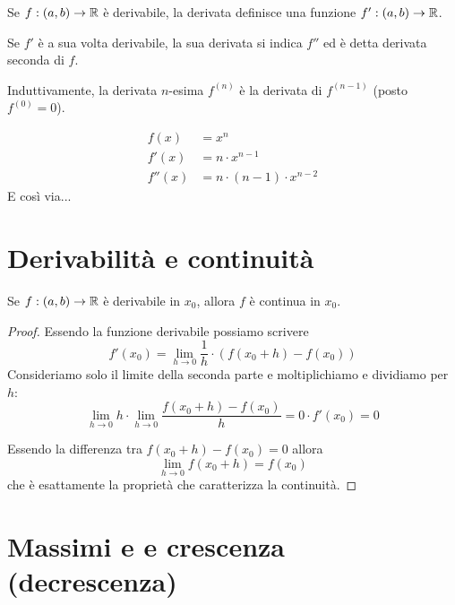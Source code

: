 \begin{definition}
Se $f: (a, b) \to \mathbb R$ è derivabile, la derivata definisce una funzione $f': (a, b) \to \mathbb R$.
\end{definition}

Se $f'$ è a sua volta derivabile, la sua derivata si indica $f''$ ed è detta derivata seconda di $f$. 

Induttivamente, la derivata $n$-esima $f^{(n)}$ è la derivata di $f^{(n-1)}$ (posto $f^{(0)} = 0$).

\begin{example}
\begin{align*}
f(x) &= x^n \\
f'(x) &= n \cdot x^{n-1} \\
f''(x) &= n \cdot (n-1) \cdot x^{n-2} 
\end{align*}
E così via...
\end{example}

\section{Derivabilità e continuità}

\begin{proposition}
Se $f : (a, b) \to \mathbb R$ è derivabile in $x_0$, allora $f$ è continua in $x_0$.
\end{proposition}

\begin{proof}
Essendo la funzione derivabile possiamo scrivere
\begin{equation*}
f'(x_0) = \lim_{h \to 0} \frac{1}{h} \cdot (f(x_0+h)-f(x_0))
\end{equation*}
Consideriamo solo il limite della seconda parte e moltiplichiamo e dividiamo per $h$:
\begin{equation*}
\lim_{h \to 0} h \cdot \lim_{h \to 0} \frac{f(x_0+h)-f(x_0)}{h} = 0 \cdot f'(x_0) = 0
\end{equation*}

Essendo la differenza tra $f(x_0+h) - f(x_0) = 0$ allora
\begin{equation*}
\lim_{h \to 0} f(x_0+h) = f(x_0)
\end{equation*}
che è esattamente la proprietà che caratterizza la continuità.
\end{proof}

\section{Massimi e e crescenza (decrescenza)}


